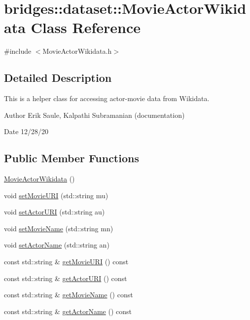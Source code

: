 \hypertarget{classbridges_1_1dataset_1_1_movie_actor_wikidata}{}\section{bridges\+:\+:dataset\+:\+:Movie\+Actor\+Wikidata Class Reference}
\label{classbridges_1_1dataset_1_1_movie_actor_wikidata}


{\ttfamily \#include $<$Movie\+Actor\+Wikidata.\+h$>$}



\subsection{Detailed Description}
This is a helper class for accessing actor-\/movie data from Wikidata. 

\begin{DoxyAuthor}{Author}
Erik Saule, Kalpathi Subramanian (documentation) 
\end{DoxyAuthor}
\begin{DoxyDate}{Date}
12/28/20 
\end{DoxyDate}
\subsection*{Public Member Functions}
\begin{DoxyCompactItemize}
\item 
\hyperlink{classbridges_1_1dataset_1_1_movie_actor_wikidata_ac759b2c1a784de9b807981a74dd96d13}{Movie\+Actor\+Wikidata} ()
\item 
void \hyperlink{classbridges_1_1dataset_1_1_movie_actor_wikidata_a0401689bb58878b12cf5e30182313129}{set\+Movie\+U\+RI} (std\+::string mu)
\item 
void \hyperlink{classbridges_1_1dataset_1_1_movie_actor_wikidata_aafc78c4df66a895757d8e4edff583d0e}{set\+Actor\+U\+RI} (std\+::string au)
\item 
void \hyperlink{classbridges_1_1dataset_1_1_movie_actor_wikidata_abcb8bbf42fdabb1b13ffc04645be7c6e}{set\+Movie\+Name} (std\+::string mn)
\item 
void \hyperlink{classbridges_1_1dataset_1_1_movie_actor_wikidata_a4d3f6d1c293fb778958b0dbe7e841984}{set\+Actor\+Name} (std\+::string an)
\item 
const std\+::string \& \hyperlink{classbridges_1_1dataset_1_1_movie_actor_wikidata_acc96d22ba00df1c2b8d7224350c7570a}{get\+Movie\+U\+RI} () const
\item 
const std\+::string \& \hyperlink{classbridges_1_1dataset_1_1_movie_actor_wikidata_a72f7f246d3e7392443d5a8d8a0874e5a}{get\+Actor\+U\+RI} () const
\item 
const std\+::string \& \hyperlink{classbridges_1_1dataset_1_1_movie_actor_wikidata_a03b02bc1a7f4b20ee92be551b90f5835}{get\+Movie\+Name} () const
\item 
const std\+::string \& \hyperlink{classbridges_1_1dataset_1_1_movie_actor_wikidata_a3744c7fe859c8bca256eeda846a81949}{get\+Actor\+Name} () const
\end{DoxyCompactItemize}


